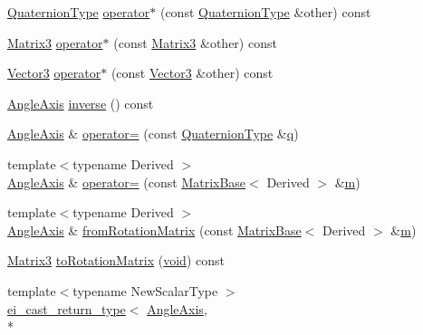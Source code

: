 \begin{DoxyCompactItemize}
\hyperlink{class_angle_axis_af3a8449f8ac6c99fa33cac3f390e97f4}{Quaternion\-Type} \hyperlink{class_angle_axis_abb4a70537c7b29f2ed2c5f06d1d834f7}{operator$\ast$} (const \hyperlink{class_angle_axis_af3a8449f8ac6c99fa33cac3f390e97f4}{Quaternion\-Type} \&other) const 
\item 
\hyperlink{class_angle_axis_a6f1c9f87a9dccd91fc397e4e007f3668}{Matrix3} \hyperlink{class_angle_axis_afa3bea040173ba8bb21f803b451c56e9}{operator$\ast$} (const \hyperlink{class_angle_axis_a6f1c9f87a9dccd91fc397e4e007f3668}{Matrix3} \&other) const 
\item 
\hyperlink{class_angle_axis_a56196b7afb477e4f60bc8819cf63c6ec}{Vector3} \hyperlink{class_angle_axis_a58f727383e53a0a4f1eec1e247bb6a7c}{operator$\ast$} (const \hyperlink{class_angle_axis_a56196b7afb477e4f60bc8819cf63c6ec}{Vector3} \&other) const 
\item 
\hyperlink{class_angle_axis}{Angle\-Axis} \hyperlink{class_angle_axis_aaa55582e2d8f3aa33d11c289ba5359c0}{inverse} () const 
\item 
\hyperlink{class_angle_axis}{Angle\-Axis} \& \hyperlink{class_angle_axis_abddec4673d038e5eddb63c3209ebbebb}{operator=} (const \hyperlink{class_angle_axis_af3a8449f8ac6c99fa33cac3f390e97f4}{Quaternion\-Type} \&\hyperlink{glext_8h_afb30bc844faa48275d1c84294956a44b}{q})
\item 
{\footnotesize template$<$typename Derived $>$ }\\\hyperlink{class_angle_axis}{Angle\-Axis} \& \hyperlink{class_angle_axis_aaaf990cd535603e2217aab5ebc7d5f50}{operator=} (const \hyperlink{class_matrix_base}{Matrix\-Base}$<$ Derived $>$ \&\hyperlink{glext_8h_af593500c283bf1a787a6f947f503a5c2}{m})
\item 
{\footnotesize template$<$typename Derived $>$ }\\\hyperlink{class_angle_axis}{Angle\-Axis} \& \hyperlink{class_angle_axis_af3f842da3eb7b75817116461d7d1d3aa}{from\-Rotation\-Matrix} (const \hyperlink{class_matrix_base}{Matrix\-Base}$<$ Derived $>$ \&\hyperlink{glext_8h_af593500c283bf1a787a6f947f503a5c2}{m})
\item 
\hyperlink{class_angle_axis_a6f1c9f87a9dccd91fc397e4e007f3668}{Matrix3} \hyperlink{class_angle_axis_a4b87f1b555abd10ed70a4d95ef82a132}{to\-Rotation\-Matrix} (\hyperlink{group___u_a_v_objects_plugin_ga444cf2ff3f0ecbe028adce838d373f5c}{void}) const 
\item 
{\footnotesize template$<$typename New\-Scalar\-Type $>$ }\\\hyperlink{structei__cast__return__type}{ei\-\_\-cast\-\_\-return\-\_\-type}$<$ \hyperlink{class_angle_axis}{Angle\-Axis}, \\*

\end{DoxyCompactItemize}
